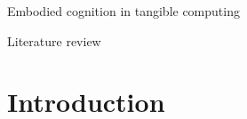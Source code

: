 \documentclass{article}
\begin{document}


\begin{titlepage}
\pagecolor{chaptertitlepagecolor}
\noindent
\color{white}
\large
{\textsf{Embodied cognition in tangible computing}}\\ 
\makebox[0pt][l]{\rule{1.3\textwidth}{1pt}}
\par
\noindent
\textcolor{chapternamecolor}
{\textsf{Literature review}}\vfill
\end{titlepage}
\restoregeometry %
\pagecolor{white}


\tableofcontents
\pagebreak


\section{Introduction}
\end{document}
